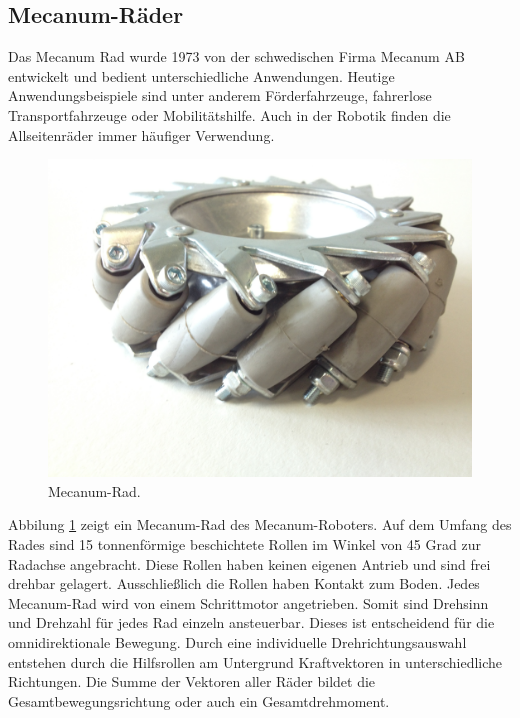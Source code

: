 \subsection*{Mecanum-Räder}
\label{sec:Mecanum-Räder}
Das Mecanum Rad wurde 1973 von der schwedischen Firma Mecanum AB entwickelt und bedient unterschiedliche Anwendungen. Heutige Anwendungsbeispiele sind unter anderem Förderfahrzeuge, fahrerlose Transportfahrzeuge oder Mobilitätshilfe. Auch in der Robotik finden die Allseitenräder immer häufiger Verwendung.
\begin{figure}[H]
\centering
 \includegraphics[width=.6\textwidth]{Abbildungen/Mecanumrad} 
\caption[Mecanum-Rad]{Mecanum-Rad.}
\label{fig:Mecanum-Rad}
\end{figure}
Abbilung \ref{fig:Mecanum-Rad} zeigt ein Mecanum-Rad des Mecanum-Roboters. Auf dem Umfang des Rades sind 15 tonnenförmige beschichtete Rollen im Winkel von 45 Grad zur Radachse angebracht. Diese Rollen haben keinen eigenen Antrieb und sind frei drehbar gelagert. Ausschließlich die Rollen haben Kontakt zum Boden.
Jedes Mecanum-Rad wird von einem Schrittmotor angetrieben. Somit sind Drehsinn und Drehzahl für jedes Rad einzeln ansteuerbar. Dieses ist entscheidend für die omnidirektionale Bewegung.
Durch eine individuelle Drehrichtungsauswahl entstehen durch die Hilfsrollen am Untergrund Kraftvektoren in unterschiedliche Richtungen. Die Summe der Vektoren aller Räder bildet die Gesamtbewegungsrichtung oder auch ein Gesamtdrehmoment.





















